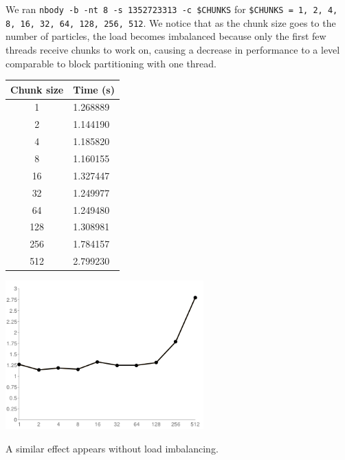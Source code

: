 \documentclass{article}[12pt;letterpaper]
\begin{document}
We ran \texttt{nbody -b -nt 8 -s 1352723313 -c \$CHUNKS} for \texttt{\$CHUNKS =
1, 2, 4, 8, 16, 32, 64, 128, 256, 512}. We notice that as the chunk size goes
to the number of particles, the load becomes imbalanced because only the first
few threads receive chunks to work on, causing a decrease in performance to a
level comparable to block partitioning with one thread.

\begin{center}\begin{tabular}{c l}
Chunk size & Time (s) \\
\hline{}
  1 & 1.268889 \\
  2 & 1.144190 \\
  4 & 1.185820 \\
  8 & 1.160155 \\
 16 & 1.327447 \\
 32 & 1.249977 \\
 64 & 1.249480 \\
128 & 1.308981 \\
256 & 1.784157 \\
512 & 2.799230
\end{tabular}

\includegraphics[width=3in]{a2_sec2_1.png}
\end{center}

A similar effect appears without load imbalancing.
\end{document}
